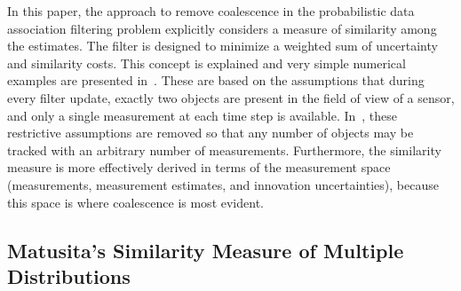 In this paper, the approach to remove coalescence in the probabilistic data association filtering problem explicitly considers a measure of similarity among the estimates.
The filter is designed to minimize a weighted sum of uncertainty and similarity costs.
This concept is explained and very simple numerical examples are presented in~\cite{KauLovLee14}.
These are based on the assumptions that during every filter update, exactly two objects are present in the field of view of a sensor, and only a single measurement at each time step is available.
In~\cite{KauLovLeeAASDA15}, these restrictive assumptions are removed so that any number of objects may be tracked with an arbitrary number of measurements.
Furthermore, the similarity measure is more effectively derived in terms of the measurement space (measurements, measurement estimates, and innovation uncertainties), because this space is where coalescence is most evident.

\subsection{Matusita's Similarity Measure of Multiple Distributions}

